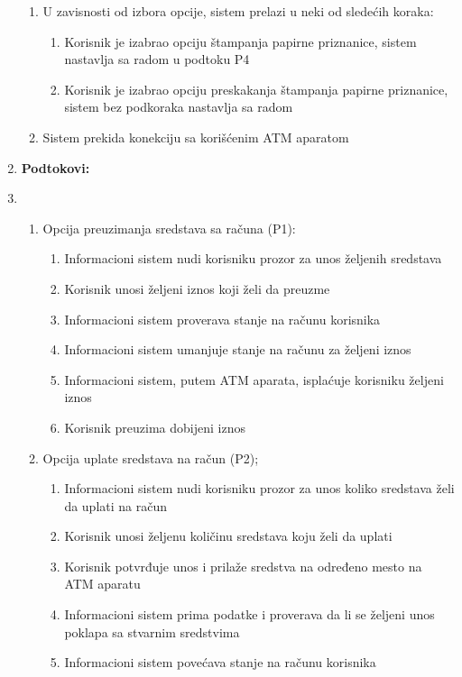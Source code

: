 \documentclass{article}
\begin{document}
\begin{enumerate}
\begin{enumerate}
      \item U zavisnosti od izbora opcije, sistem prelazi u neki od sledećih koraka:  
      \begin{enumerate}
        \item Korisnik je izabrao opciju štampanja papirne priznanice, sistem nastavlja sa radom u podtoku P4
        \item Korisnik je izabrao opciju preskakanja štampanja papirne priznanice, sistem bez podkoraka nastavlja sa radom
      \end{enumerate}
      \item Sistem prekida konekciju sa korišćenim ATM aparatom
    \end{enumerate}
  \item \textbf{Podtokovi: } 
    \item \begin{enumerate}
     
      \item Opcija preuzimanja sredstava sa računa (P1):
        
      \begin{enumerate}
          \item Informacioni sistem nudi korisniku prozor za unos željenih sredstava
          \item Korisnik unosi željeni iznos koji želi da preuzme
          \item Informacioni sistem proverava stanje na računu korisnika
          \item Informacioni sistem umanjuje stanje na računu za željeni iznos  
          \item Informacioni sistem, putem ATM aparata, isplaćuje korisniku željeni iznos
          \item Korisnik preuzima dobijeni iznos 
        \end{enumerate}
        
        \item Opcija uplate sredstava na račun (P2);
        
        \begin{enumerate}
          \item Informacioni sistem nudi korisniku prozor za unos koliko sredstava želi da uplati na račun
          \item Korisnik unosi željenu količinu sredstava koju želi da uplati
          \item Korisnik potvrđuje unos i prilaže sredstva na određeno mesto na ATM aparatu
          \item Informacioni sistem prima podatke i proverava da li se željeni unos poklapa sa stvarnim sredstvima
          \item Informacioni sistem povećava stanje na računu korisnika
        \end{enumerate}
     

\end{enumerate}
\end{enumerate}
\end{document}
